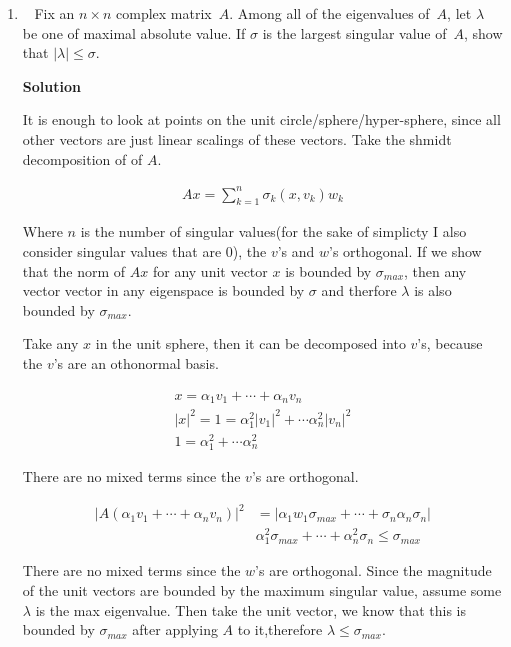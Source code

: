\documentclass[11pt]{article}
\newcommand\score[1]{\marginpar{\vspace{-2ex}\color{blue}{#1/14}}\hspace{-1ex}}
\newcommand\0{\mathbf{0}}
\newcommand\<{\langle}
\renewcommand\>{\rangle}
\begin{document}
\begin{enumerate}
\item\ \score{}%
Fix an $n \times n$ complex matrix~$A$.  Among all of the eigenvalues
of~$A$, let $\lambda$ be one of maximal absolute value.  If $\sigma$
is the largest singular value of~$A$, show that $|\lambda| \leq
\sigma$.

\textbf{Solution}

It is enough to look at points on the unit circle/sphere/hyper-sphere, since all 
other vectors are just linear scalings of these vectors. Take the shmidt decomposition of 
of $A$.

\begin{align*}
	Ax=\sum_{k=1}^{n}{\sigma_{k}(x,v_{k})w_{k}}
\end{align*}

Where $n$ is the number of singular values(for the sake of simplicty I also consider singular values that are 0), the $v$'s and $w$'s orthogonal.
If we show that the norm of $Ax$ for any unit vector $x$ is bounded by $\sigma_{max}$, then 
any vector vector in any eigenspace is bounded by $\sigma$ and therfore $\lambda$ is also bounded by $\sigma_{max}$.

Take any $x$ in the unit sphere, then it can be decomposed into $v$'s, because the $v$'s are an othonormal basis.

\begin{align*}
	x=\alpha_{1}v_{1}+\cdots +\alpha_{n}v_{n}\\
	|x|^{2}=1=\alpha_{1}^{2}|v_{1}|^{2} +\cdots \alpha_{n}^{2}|v_{n}|^{2}\\
	1=\alpha_{1}^{2} +\cdots \alpha_{n}^{2}
\end{align*}

There are no mixed terms since the $v$'s are orthogonal.

\begin{align*}
	|A(\alpha_{1}v_{1}+\cdots+\alpha_{n}v_{n})|^{2}&=|\alpha_{1}w_{1}\sigma_{max}+\cdots +\sigma_{n}\alpha_{n}\sigma_{n}|\\
	&\alpha_{1}^{2}\sigma_{max}+\cdots +\alpha_{n}^{2}\sigma_{n}\leq \sigma_{max}
\end{align*}

There are no mixed terms since the $w$'s are orthogonal. Since the magnitude of the unit vectors are 
bounded by the maximum singular value, assume some $\lambda$ is the max eigenvalue. Then take the unit vector,
we know that this is bounded by $\sigma_{max}$ after applying $A$ to it,therefore $\lambda\leq \sigma_{max}$.


\end{enumerate}
\end{document}
